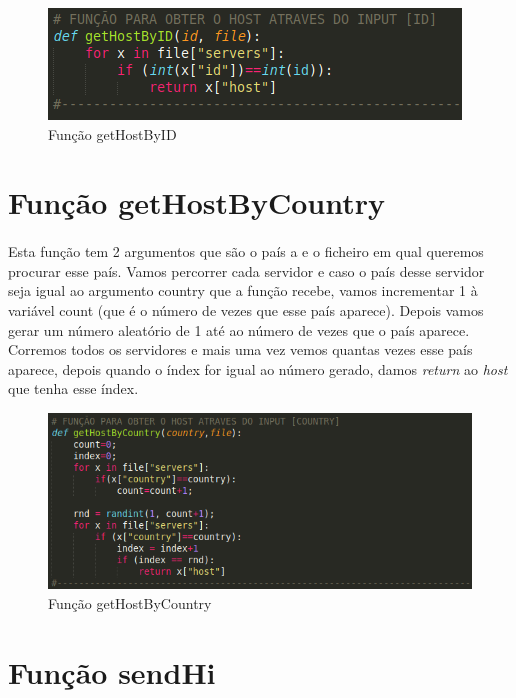 \documentclass{report}
\begin{document}
\begin{figure}[H]
\centering
\includegraphics[width=1.1\linewidth]{getHostByID.png}
\caption{Função getHostByID}
\label{getHost}
\end{figure}


\newpage


\section{Função getHostByCountry }
\label{sec:getHostByCountry}
\paragraph{}
Esta função tem 2 argumentos que são o país a e o ficheiro em qual queremos procurar esse país.
Vamos percorrer cada servidor e caso o país desse servidor seja igual ao argumento country que a função recebe, vamos incrementar 1 à variável count (que é o número de vezes que esse país aparece). \newline
Depois vamos gerar um número aleatório de 1 até ao número de vezes que o país aparece.
Corremos todos os servidores e mais uma vez vemos quantas vezes esse país aparece, depois quando o índex for igual ao número gerado, damos \textit{return} ao \textit{host} que tenha esse índex.

\begin{figure}[H]
\centering
\includegraphics[width=0.9\linewidth]{getHostByCountry.png}
\caption{Função getHostByCountry}
\label{getHostCountry}
\end{figure}


\section{Função sendHi }
\label{sec:sendHi}
\end{document}

